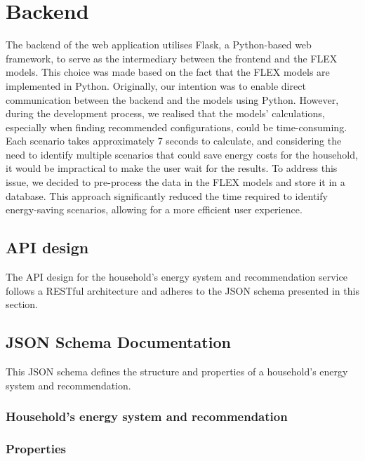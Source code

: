 \section{Backend}

The backend of the web application utilises Flask, a Python-based web framework, to serve as the intermediary between the frontend and the FLEX models. 
This choice was made based on the fact that the FLEX models are implemented in Python. 
Originally, our intention was to enable direct communication between the backend and the models using Python. 
However, during the development process, we realised that the models' calculations, especially when finding recommended configurations, could be time-consuming. 
Each scenario takes approximately 7 seconds to calculate, and considering the need to identify multiple scenarios that could save energy costs for the household, 
it would be impractical to make the user wait for the results. 
To address this issue, we decided to pre-process the data in the FLEX models and store it in a database. 
This approach significantly reduced the time required to identify energy-saving scenarios, allowing for a more efficient user experience.


\subsection{API design}

The API design for the household's energy system and recommendation service follows a RESTful architecture and adheres to the JSON schema presented in this section. 


\subsection{JSON Schema Documentation}

This JSON schema defines the structure and properties of a household's energy system and recommendation.


\subsubsection{Household's energy system and recommendation}


\subsubsection{Properties}

